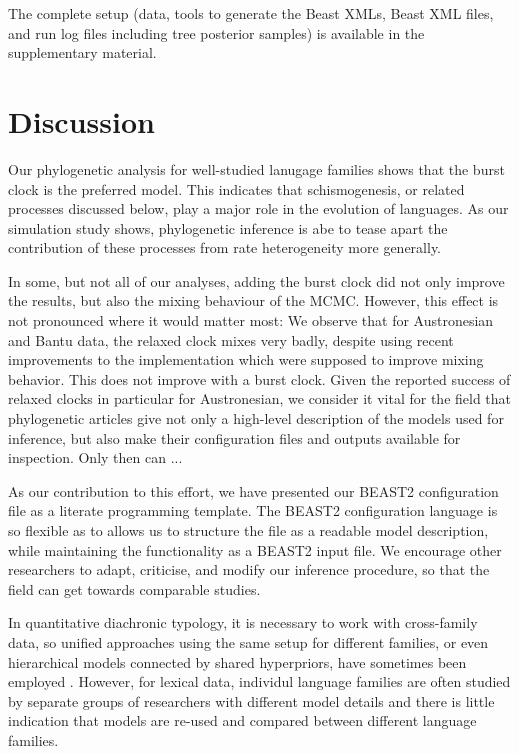 \documentclass[a4paper,12pt]{scrartcl}
\begin{document}
The complete setup (data, tools to generate the Beast XMLs, Beast XML files, and
run log files including tree posterior samples) is available in the
supplementary material.

\section{Discussion}\label{s:discussion}


Our phylogenetic analysis for well-studied lanugage families shows that the
burst clock is the preferred model. This indicates that schismogenesis, or
related processes discussed below, play a major role in the evolution of
languages. As our simulation study shows, phylogenetic inference is abe to tease
apart the contribution of these processes from rate heterogeneity more
generally.

In some, but not all of our analyses, adding the burst clock did not only
improve the results, but also the mixing behaviour of the MCMC. However, this
effect is not pronounced where it would matter most: We observe that for
Austronesian and Bantu data, the relaxed clock mixes very badly, despite using
recent improvements to the implementation which were supposed to improve mixing
behavior. This does not improve with a burst clock. Given the reported success
of relaxed clocks in particular for Austronesian, we consider it vital for the
field that phylogenetic articles give not only a high-level description of the
models used for inference, but also make their configuration files and outputs
available for inspection. Only then can ...

As our contribution to this effort, we have presented our BEAST2 configuration
file as a literate programming template. The BEAST2 configuration language is so
flexible as to allows us to structure the file as a readable model description,
while maintaining the functionality as a BEAST2 input file. We encourage other
researchers to adapt, criticise, and modify our inference procedure, so that the
field can get towards comparable studies.

In quantitative diachronic typology, it is necessary to work with cross-family
data, so unified approaches using the same setup for different families, or even
hierarchical models connected by shared hyperpriors, have sometimes been
employed \parencite{dunn2011evolved,jager2021phylogenetic}. However, for lexical
data, individul language families are often studied by separate groups of
researchers with different model details and there is little indication that
models are re-used and compared between different language families.
\end{document}
